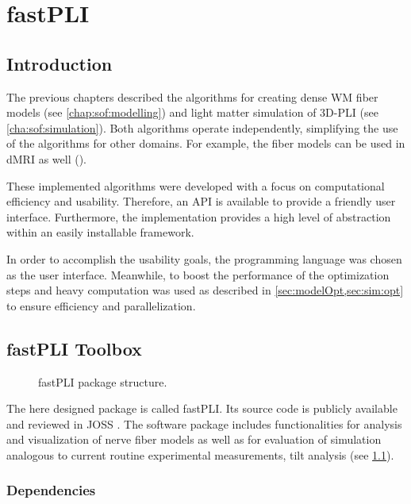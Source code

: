 \cleardoublepage
\setcounter{chapter}{6}
\chapter{\acs{fastPLI}}
\label{chap:Software}
% 
% 
% 
\section{Introduction}\label{sec:fastpliIntro}
%
The previous chapters described the algorithms for creating dense \ac{WM} fiber models (see \cref{chap:sof:modelling}) and light matter simulation of \ac{3D-PLI} (see \cref{cha:sof:simulation}).
Both algorithms operate independently, simplifying the use of the algorithms for other domains.
For example, the fiber models can be used in \ac{dMRI} as well (\cite{Ginsburger2019,ginsburgerDis2019}).

These implemented algorithms were developed with a focus on computational efficiency and usability.
Therefore, an \ac{API} is available to provide a friendly user interface.
Furthermore, the implementation provides a high level of abstraction within an easily installable framework. 
\par
%
In order to accomplish the usability goals, the \python{} programming language was chosen as the user interface.
Meanwhile, to boost the performance of the optimization steps and heavy computation \cpp{} was used as described in \cref{sec:modelOpt,sec:sim:opt} to ensure efficiency and parallelization.
%
% 
% 
\section{fastPLI Toolbox}
%
\begin{figure}[!ht]
\centering
{}
\caption{\acs{fastPLI} package structure.}
\label{fig:fastpli}
\end{figure}
%
The here designed \python{} package is called  \ac{fastPLI}.
Its source code is publicly available and reviewed in \ac{JOSS} \cite{fastpli,Matuschke2021}.
The software package includes functionalities for analysis and visualization of nerve fiber models as well as for evaluation of simulation analogous to current routine experimental measurements, \eg{} tilt analysis (see \cref{fig:fastpli}).
%
%
% 
\newpage
\subsection{Dependencies}
%
